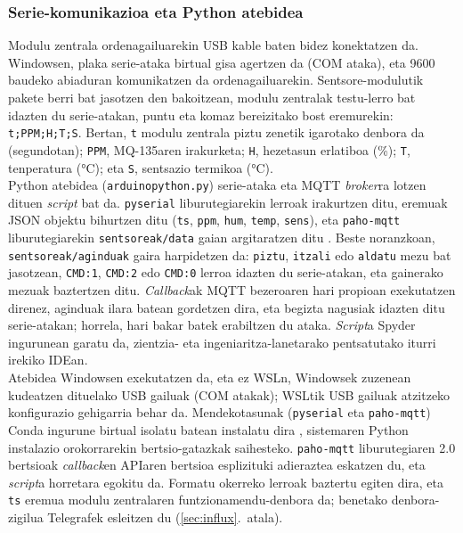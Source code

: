 \documentclass[10pt]{article}
\begin{document}
\subsubsection{Serie-komunikazioa eta Python atebidea}
\label{sec:serie}

Modulu zentrala ordenagailuarekin \ac{USB} kable baten bidez konektatzen da. Windowsen, plaka serie-ataka birtual gisa agertzen da (COM ataka), eta 9600 baudeko abiaduran komunikatzen da ordenagailuarekin. Sentsore-modulutik pakete berri bat jasotzen den bakoitzean, modulu zentralak testu-lerro bat idazten du serie-atakan, puntu eta komaz bereizitako bost eremurekin: \texttt{t;PPM;H;T;S}. Bertan, \texttt{t} modulu zentrala piztu zenetik igarotako denbora da (segundotan); \texttt{PPM}, MQ-135aren irakurketa; \texttt{H}, hezetasun erlatiboa (\%); \texttt{T}, tenperatura (°C); eta \texttt{S}, sentsazio termikoa (°C).\\

Python atebidea (\texttt{arduinopython.py}) serie-ataka eta \ac{MQTT} \textit{broker}ra lotzen dituen \textit{script} bat da. \texttt{pyserial} liburutegiarekin lerroak irakurtzen ditu, eremuak \ac{JSON} objektu bihurtzen ditu (\texttt{ts}, \texttt{ppm}, \texttt{hum}, \texttt{temp}, \texttt{sens}), eta \texttt{paho-mqtt} liburutegiarekin \texttt{sentsoreak/data} gaian argitaratzen ditu \cite{pyserial,pahomqtt}. Beste noranzkoan, \texttt{sentsoreak/aginduak} gaira harpidetzen da: \texttt{piztu}, \texttt{itzali} edo \texttt{aldatu} mezu bat jasotzean, \texttt{CMD:1}, \texttt{CMD:2} edo \texttt{CMD:0} lerroa idazten du serie-atakan, eta gainerako mezuak baztertzen ditu. \textit{Callback}ak \ac{MQTT} bezeroaren hari propioan exekutatzen direnez, aginduak ilara batean gordetzen dira, eta begizta nagusiak idazten ditu serie-atakan; horrela, hari bakar batek erabiltzen du ataka. \textit{Script}a Spyder ingurunean garatu da, zientzia- eta ingeniaritza-lanetarako pentsatutako iturri irekiko \ac{IDE}an.\\

Atebidea Windowsen exekutatzen da, eta ez \ac{WSL}n, Windowsek zuzenean kudeatzen dituelako \ac{USB} gailuak (COM atakak); \ac{WSL}tik \ac{USB} gailuak atzitzeko konfigurazio gehigarria behar da. Mendekotasunak (\texttt{pyserial} eta \texttt{paho-mqtt}) Conda ingurune birtual isolatu batean instalatu dira \cite{anaconda_conda}, sistemaren Python instalazio orokorrarekin bertsio-gatazkak saihesteko. \texttt{paho-mqtt} liburutegiaren 2.0 bertsioak \textit{callback}en \ac{API}aren bertsioa esplizituki adieraztea eskatzen du, eta \textit{script}a horretara egokitu da. Formatu okerreko lerroak baztertu egiten dira, eta \texttt{ts} eremua modulu zentralaren funtzionamendu-denbora da; benetako denbora-zigilua Telegrafek esleitzen du (\ref{sec:influx}.~atala).\\
\end{document}
